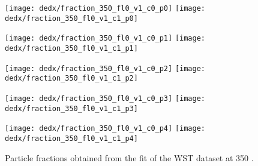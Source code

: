 \begin{figure}
  \centering
  \texttt{[image: dedx/fraction\_350\_fl0\_v1\_c0\_p0]}
  \texttt{[image: dedx/fraction\_350\_fl0\_v1\_c1\_p0]}

  \texttt{[image: dedx/fraction\_350\_fl0\_v1\_c0\_p1]}
  \texttt{[image: dedx/fraction\_350\_fl0\_v1\_c1\_p1]}

  \texttt{[image: dedx/fraction\_350\_fl0\_v1\_c0\_p2]}
  \texttt{[image: dedx/fraction\_350\_fl0\_v1\_c1\_p2]}


  \texttt{[image: dedx/fraction\_350\_fl0\_v1\_c0\_p3]}
  \texttt{[image: dedx/fraction\_350\_fl0\_v1\_c1\_p3]}

  \texttt{[image: dedx/fraction\_350\_fl0\_v1\_c0\_p4]}
  \texttt{[image: dedx/fraction\_350\_fl0\_v1\_c1\_p4]}

  \caption{Particle fractions obtained from the fit of the WST dataset at 350 \GeVc.}
  \label{fig:hadron:dedx:fit:frac350w}
\end{figure}

\clearpage

